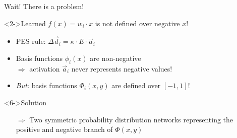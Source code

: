 \documentclass[aspectratio=169]{beamer}
\begin{document}
\begin{frame}{Wait! There is a problem!}
	\begin{block}<2->{Learned $f(x) = w_i \cdot x$ is not defined over negative $x$!}
		\begin{itemize}
			\setlength{\itemsep}{0.5cm}
			\item<3-> PES rule: $\Delta \vec d_i = \kappa \cdot E \cdot \vec a_i$
			\item<4-> Basis functions $\phi_i(x)$ are non-negative\\
			{\color{violet}$\Rightarrow$} activation $\vec a_i$ never represents negative values!
			\item<5-> {\color{violet}\emph{But:}} basis functions $\Phi_i(x, y)$ are defined over $[-1, 1]$!
		\end{itemize}
	\end{block}
	\begin{block}<6->{Solution}
		\begin{itemize}
		\item[$\Rightarrow$] Two symmetric probability distribution networks representing the positive and negative branch of $\Phi(x, y)$
		\end{itemize}
	\end{block}
\end{frame}
\end{document}
